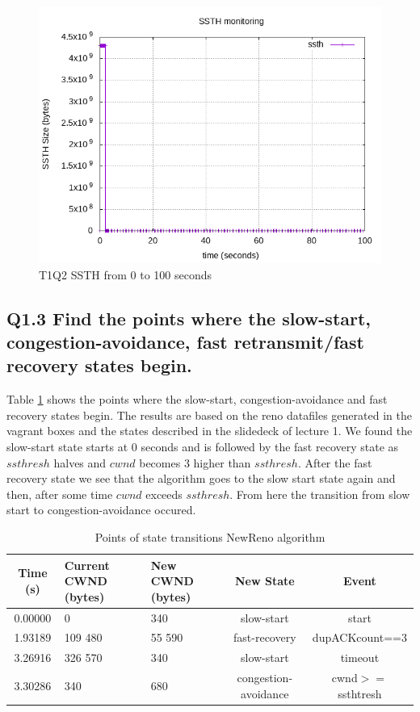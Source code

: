\documentclass{article}
\begin{document}
\begin{figure}[H]
	\includegraphics{lab1-group1-task1-question2.png}
	\caption{T1Q2 SSTH from 0 to 100 seconds}
\end{figure}


\subsection{Q1.3 Find the points where the slow-start, congestion-avoidance, fast retransmit/fast recovery states begin.}
Table \ref{table:results1} shows the points where the slow-start, congestion-avoidance and fast recovery states begin.
The results are based on the reno datafiles generated in the vagrant boxes and the states described in the slidedeck of lecture 1.
We found the slow-start state starts at 0 seconds and is followed by the fast recovery state as $ssthresh$ halves and $cwnd$ becomes 3 higher than $ssthresh$.
After the fast recovery state we see that the algorithm goes to the slow start state again and then, after some time $cwnd$ exceeds $ssthresh$. From here the transition from slow start to congestion-avoidance occured.

\begin{table}[H]
\center
\caption{Points of state transitions NewReno algorithm}
\label{table:results1}
\begin{tabular}{|c|p{25mm}|p{20mm}|c|c|}
\hline Time (s)    & Current CWND (bytes)    & New CWND (bytes)    & New State             & Event            \\
\hline 0.00000     & 0                       & 340                 & slow-start            & start            \\ 
\hline 1.93189     & 109 480                 & 55 590              & fast-recovery         & dupACKcount==3   \\ 
\hline 3.26916     & 326 570                 & 340                 & slow-start            & timeout          \\ 
\hline 3.30286     & 340                     & 680                 & congestion-avoidance  & cwnd$>=$ssthtresh  \\ 
\hline  
\end{tabular} 
\end{table}
\end{document}
